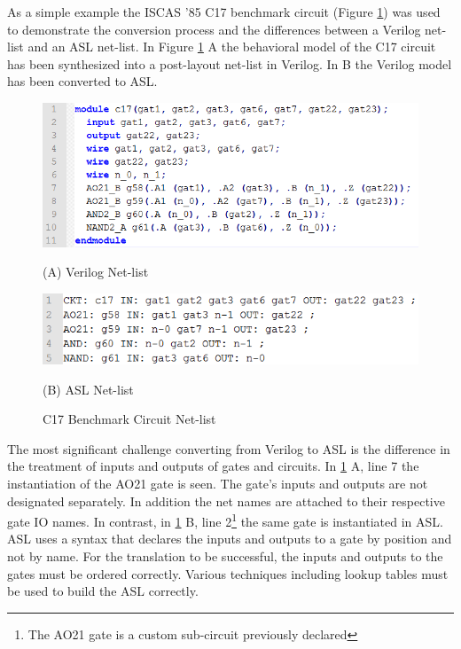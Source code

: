 \documentclass[12pt]{report}
\begin{document}
As a simple example the ISCAS '85 C17 benchmark circuit (Figure \ref{fig:c17_netlist}) was used to demonstrate the conversion process and the differences between a Verilog net-list and an ASL net-list.  In Figure \ref{fig:c17_netlist} A the behavioral model of the C17 circuit has been synthesized into a post-layout net-list in Verilog.  In B the Verilog model has been converted to ASL.
\begin{figure}[t]
	\begin{flushleft}
		\includegraphics[scale=1]{images/c17-verilog-netlist}	
	\end{flushleft}
	\begin{flushleft}
		(A) Verilog Net-list
	\end{flushleft}
	\begin{flushleft}
		\includegraphics[scale=1]{images/c17-asl-netlist}
	\end{flushleft}
	\begin{flushleft}
		(B) ASL Net-list
	\end{flushleft}
	\caption{C17 Benchmark Circuit Net-list}
	\label{fig:c17_netlist}
\end{figure}
The most significant challenge converting from Verilog to ASL is the difference in the treatment of inputs and outputs of gates and circuits.  In \ref{fig:c17_netlist} A, line 7 the instantiation of the AO21 gate is seen.  The gate's inputs and outputs are not designated separately.  In addition the net names are attached to their respective gate IO names.  In contrast, in \ref{fig:c17_netlist} B, line 2\footnote{The AO21 gate is a custom sub-circuit previously declared} the same gate is instantiated in ASL.  ASL uses a syntax that declares the inputs and outputs to a gate by position and not by name.  For the translation to be successful, the inputs and outputs to the gates must be ordered correctly.  Various techniques including lookup tables must be used to build the ASL correctly.
\end{document}
